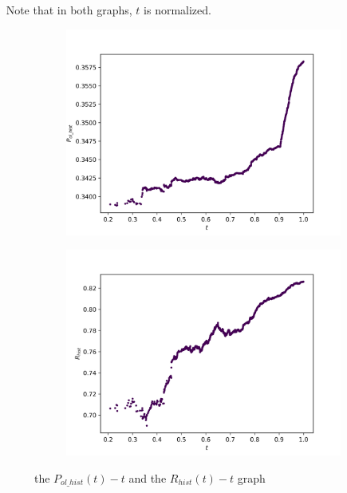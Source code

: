 \documentclass[12pt]{article}  %
\begin{document}
​		Note that in both graphs, $t$ is normalized.
\begin{figure}[H]
  \centering
  \begin{subfigure}{.5\textwidth}
    \centering
    \includegraphics[width=\linewidth]{Q2picture/Pol_hist-t.png}
    \label{fig:}
  \end{subfigure}%
  \begin{subfigure}{.5\textwidth}
    \centering
    \includegraphics[width=\linewidth]{Q2picture/R_hist-t.png}
    \label{fig:}
  \end{subfigure}
  \caption{the $P_{ol\_hist}(t)-t$ and the $R_{hist}(t)-t$ graph}
  \label{fig:}
\end{figure}
\end{document}
